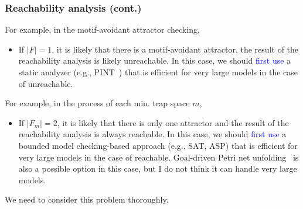 \documentclass{beamer}              %
\newcommand{\blue}[1]{\textcolor{blue}{#1}}
\begin{document}
\begin{frame}
\frametitle{Reachability analysis (cont.)}

For example, in the motif-avoidant attractor checking,
\begin{itemize}
  \item If \(|F| = 1\), it is likely that there is a motif-avoidant attractor, the result of the reachability analysis is likely unreachable. In this case, we should \blue{first use} a static analyzer (e.g., PINT~\cite{Pint}) that is efficient for very large models in the case of unreachable.
\end{itemize}

\hspace{0.0cm}

For example, in the process of each min. trap space \(m\),
\begin{itemize}
  \item If \(|F_m| = 2\), it is likely that there is only one attractor and the result of the reachability analysis is always reachable. In this case, we should \blue{first use} a bounded model checking-based approach (e.g., SAT, ASP) that is efficient for very large models in the case of reachable. Goal-driven Petri net unfolding~\cite{Chatain2016} is also a possible option in this case, but I do not think it can handle very large models.
\end{itemize}

\hspace{0.0cm}

We need to consider this problem thoroughly.

\end{frame}
\end{document}
